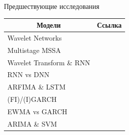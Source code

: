 \documentclass[11pt, aspectratio= 169]{beamer}
\begin{document}
	\begin{frame}{Предшествующие исследования}
		\begin{table}[H]
			\begin{tabular}{l|r}
				\toprule
				\multicolumn{1}{c}{\textbf{Модели}} & \multicolumn{1}{c}{\textbf{Ссылка}}\\
				\midrule[0.02cm]
				Wavelet Networks & \cite{alexandridis2014wavelet}\\[0.15cm]
				Multistage MSSA & \cite{kuang2020efficient}\\[0.15cm]
				Wavelet Transform \& RNN & \cite{hsieh2011forecasting}\\[0.15cm]
				RNN vs DNN & \cite{shah2018comparative}\\[0.15cm]
				ARFIMA \& LSTM & \cite{bukhari2020fractional}\\[0.15cm]
				(FI)/(I)GARCH & \cite{bentes2015forecasting}\\[0.15cm]
				EWMA vs GARCH & \cite{kuen1992forecasting}\\[0.15cm]
				ARIMA \& SVM & \cite{pai2005hybrid}\\
				\midrule[0.02cm]
			\end{tabular}
		\end{table}
	\end{frame}
	
\end{document}
